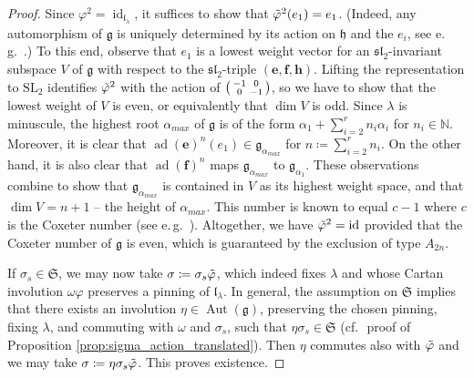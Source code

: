 \documentclass{amsart}
\newcommand{\eg}{e.\,g.}
\newcommand{\cf}{cf.\,}
\newcommand{\ad}{\operatorname{ad}}
\newcommand{\Aut}{\operatorname{Aut}}
\newcommand{\g}{\mathfrak{g}}
\newcommand{\h}{\mathfrak{h}}
\newcommand{\id}{\operatorname{id}}
\newcommand{\N}{\mathbb{N}}
\newcommand{\el}{\mathfrak{l}}
\newcommand{\SL}{\mathrm{SL}}
\renewcommand{\sl}{\mathfrak{sl}}
\theoremstyle{definition}
\theoremstyle{plain}
\theoremstyle{remark}
\begin{document}
\begin{proof}
    Since $\varphi^2 = \id_{\el_\lambda}$, it suffices to show that $\Tilde{\varphi}^2(e_1) = e_1$. (Indeed, any automorphism of $\g$ is uniquely determined by its action on $\h$ and the $e_i$, see \eg\ \cite[Thm.\,14.2]{Humphreys1972_LART}.) To this end, observe that $e_1$ is a lowest weight vector for an $\sl_2$-invariant subspace $V$ of $\g$ with respect to the $\sl_2$-triple $(\mathbf{e}, \mathbf{f}, \mathbf{h})$. Lifting the representation to $\SL_2$ identifies $\Tilde{\varphi}^2$ with the action of $\begin{psmallmatrix}
        -1 & 0\\
        0 & -1
    \end{psmallmatrix}$, so we have to show that the lowest weight of $V$ is even, or equivalently that $\dim V$ is odd. Since $\lambda$ is minuscule, the highest root $\alpha_{max}$ of $\g$ is of the form $\alpha_1 + \sum_{i=2}^r n_i\alpha_i$ for $n_i\in \N$. Moreover, it is clear that $\ad(\mathbf{e})^n (e_1) \in \g_{\alpha_{max}}$ for $n\coloneqq \sum_{i=2}^r n_i$. On the other hand, it is also clear that $\ad(\mathbf{f})^n$ maps $\g_{\alpha_{max}}$ to $\g_{\alpha_1}$. These observations combine to show that $\g_{\alpha_{max}}$ is contained in $V$ as its highest weight space, and that $\dim V = n + 1$ -- the height of $\alpha_{max}$. This number is known to equal $c-1$ where $c$ is the Coxeter number (see \eg\ \cite[Prop.\,VI.31]{Bourbaki_4to6}). Altogether, we have $\Tilde{\varphi}^2 = \id$ provided that the Coxeter number of $\g$ is even, which is guaranteed by the exclusion of type $A_{2n}$.

    If $\sigma_s\in \mathfrak{S}$, we may now take $\sigma\coloneqq \sigma_s\Tilde{\varphi}$, which indeed fixes $\lambda$ and whose Cartan involution $\omega \varphi$ preserves a pinning of $\el_\lambda$. In general, the assumption on $\mathfrak{S}$ implies that there exists an involution $\eta\in \Aut(\g)$, preserving the chosen pinning, fixing $\lambda$, and commuting with $\omega$ and $\sigma_s$, such that $\eta\sigma_s\in \mathfrak{S}$ (\cf\ proof of Proposition \ref{prop:sigma_action_translated}). Then $\eta$ commutes also with $\Tilde{\varphi}$ and we may take $\sigma\coloneqq \eta \sigma_s \Tilde{\varphi}$. This proves existence.


\end{proof}
\end{document}
